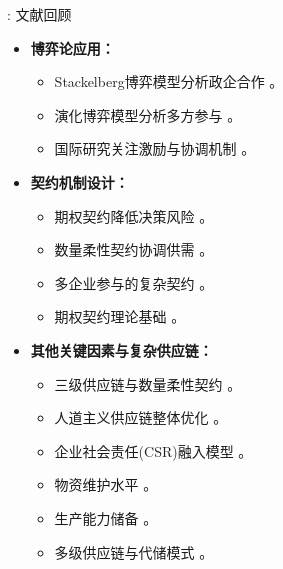 \documentclass[9pt]{beamer}
\begin{document}
\begin{frame}{\insertsectionhead: 文献回顾}
    \begin{itemize}
        \item \textbf{博弈论应用：}
            \begin{itemize}
                \item Stackelberg博弈模型分析政企合作 \cite{Li2022Stackelberg}。
                \item 演化博弈模型分析多方参与 \cite{Zhang2022Evolutionary, shao2023非常规突发事件}。
                \item 国际研究关注激励与协调机制 \cite{egan2010private, balcik2010coordination, vanwyk2011modeling, coskun2019relief}。
            \end{itemize}
        \item \textbf{契约机制设计：}
            \begin{itemize}
                \item 期权契约降低决策风险 \cite{rabbani2015option, wang2015prepurchasing, Pang2020PhysicalOption}。
                \item 数量柔性契约协调供需 \cite{nikkhoo2018coordination, chai2021考虑储备周期}。
                \item 多企业参与的复杂契约 \cite{Chen2023Contract, Li2024CooperationStrategies}。
                \item 期权契约理论基础 \cite{black1973pricing, barnes2002coordination, xu2010managing}。
            \end{itemize}
        \item \textbf{其他关键因素与复杂供应链：}
            \begin{itemize}
                \item 三级供应链与数量柔性契约 \cite{Gong2024Quantity}。
                \item 人道主义供应链整体优化 \cite{torabi2018integrated}。
                \item 企业社会责任(CSR)融入模型 \cite{zhengh2023}。
                \item 物资维护水平 \cite{wang2023考虑维护水平}。
                \item 生产能力储备 \cite{hu2018考虑企业生产能力, zhang2016emergency}。
                \item 多级供应链与代储模式 \cite{jiang2024基于代储模式}。
            \end{itemize}
    \end{itemize}
\end{frame}
\end{document}
